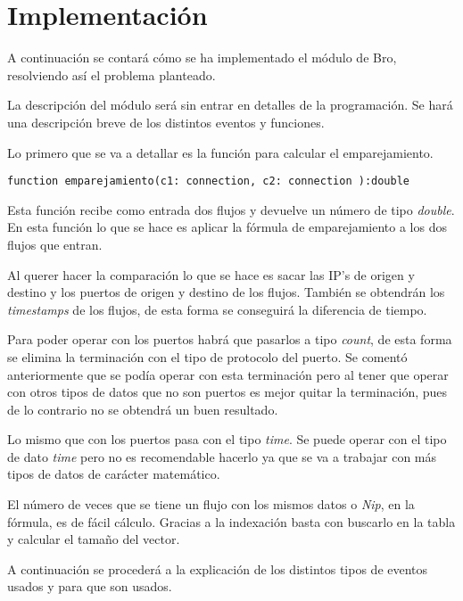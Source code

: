 \chapter{Implementación}

A continuación se contará cómo se ha implementado el módulo de Bro, resolviendo así el problema planteado.

\intro La descripción del módulo será sin entrar en detalles de la programación. Se hará una descripción 
breve de los distintos eventos y funciones.

\intro Lo primero que se va a detallar es la función para calcular el emparejamiento.

\begin{lstlisting}[style=CodigoC]
function emparejamiento(c1: connection, c2: connection ):double 

\end{lstlisting}

\intro Esta función recibe como entrada dos flujos y devuelve un número de tipo \textit{double}. En esta función 
lo que se hace es aplicar la fórmula de emparejamiento a los dos flujos que entran.

\intro Al querer hacer la comparación lo que se hace es sacar las IP's de origen y destino y los puertos de 
origen y destino de los flujos. También se obtendrán los \textit{timestamps} de los flujos, de esta forma se 
conseguirá la diferencia de tiempo. 

\intro Para poder operar con los puertos habrá que pasarlos a tipo \textit{count}, de esta forma se elimina la 
terminación con el tipo de protocolo del puerto. Se comentó anteriormente que se podía operar con esta terminación 
pero al tener que operar con otros tipos de datos que no son puertos es mejor quitar la terminación, pues de lo 
contrario no se obtendrá un buen resultado. 

\intro Lo mismo que con los puertos pasa con el tipo \textit{time}. Se puede operar con el tipo de dato 
\textit{time} pero no es recomendable hacerlo ya que se va a trabajar con más tipos de datos de carácter 
matemático.

\intro El número de veces que se tiene un flujo con los mismos datos o \textit{Nip}, en la fórmula, es de fácil 
cálculo. Gracias a la indexación basta con buscarlo en la tabla y calcular el tamaño del vector. 

\intro A continuación se procederá a la explicación de los distintos tipos de eventos usados y para que son usados.

